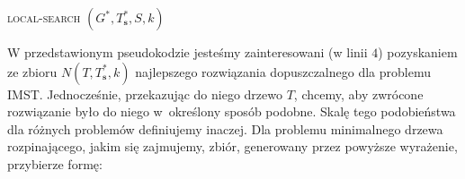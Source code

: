 \begin{pseudokod}
	\DontPrintSemicolon
	\caption{
		\textsc{local-search} $\left( G^{\ast}, T^{\ast}_{\textbf{s}}, S, k \right)$
	}
	\label{alg:localsearch}
\end{pseudokod}

W przedstawionym pseudokodzie jesteśmy zainteresowani (w linii $4$) pozyskaniem ze zbioru $N \left( T, T^{\ast}_{\textbf{s}}, k \right)$ najlepszego rozwiązania dopuszczalnego dla problemu \textsc{IMST}.
Jednocześnie, przekazując do niego drzewo $T$, chcemy, aby zwrócone rozwiązanie było do niego w~określony sposób podobne.
Skalę tego podobieństwa dla różnych problemów definiujemy inaczej.
Dla problemu minimalnego drzewa rozpinającego, jakim się zajmujemy, zbiór, generowany przez powyższe wyrażenie, przybierze formę:

